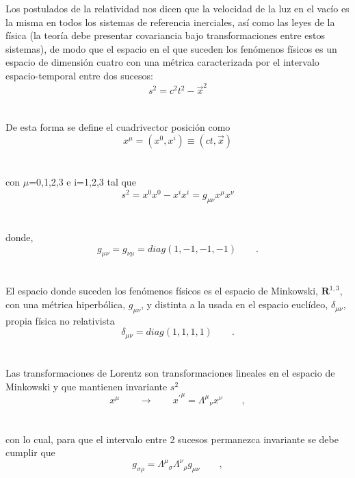 \documentclass[11pt,letterpaper]{article}     %
\begin{document}
Los postulados de la relatividad nos dicen que la velocidad de la luz en el vacío es la misma en todos los sistemas de referencia inerciales, así como las leyes de la física (la teoría debe presentar covariancia bajo transformaciones entre estos sistemas), de modo que el espacio en el que suceden los fenómenos físicos es un espacio de dimensión cuatro con una métrica caracterizada por el intervalo espacio-temporal entre dos sucesos:
\begin{equation} \label{eq:3}
s^2=c^2t^2-\vec{x}^{ 2}
\end{equation} \\ \\
De esta forma se define el cuadrivector posición como
\begin{equation}\label{eq:4}
x^\mu=(x^0,x^i) \equiv (ct,\vec{x})
\end{equation} \\ \\
con $\mu$=0,1,2,3 e i=1,2,3 tal que
\begin{equation} \label{eq:5}
s^2=x^0x^0 - x^i x^i = g_{\mu \nu} x^\mu x^\nu
\end{equation} \\ \\
donde,
\begin{equation} \label{eq:6}
g_{\mu \nu} = g_{\nu \mu} = diag(1,-1,-1,-1) \qquad .
\end{equation} \\ \\
El espacio donde suceden los fenómenos físicos es el espacio de Minkowski, $\mathbf{R}^{1,3}$, con una métrica hiperbólica, $g_{\mu \nu}$, y distinta a la usada en el espacio euclídeo, $\delta_{\mu \nu}$, propia física no relativista
\begin{equation} \label{eq:7}
\delta_{\mu \nu} = diag(1,1,1,1) \qquad .
\end{equation} \\ \\
 Las transformaciones de Lorentz son transformaciones lineales en el espacio de Minkowski y que mantienen invariante $s^2$
\begin{equation} \label{eq:8}
x^{\mu} \qquad \rightarrow \qquad {x^{'}}^{\mu}={\Lambda^\mu}_\nu x^\nu \qquad,
\end{equation} \\ \\
con lo cual, para que el intervalo entre 2 sucesos permanezca invariante se debe cumplir que
\begin{equation}  \label{eq:9}
g_{\sigma \rho}={\Lambda^\mu}_\sigma {\Lambda^\nu}_\rho g_{\mu \nu} \qquad ,
\end{equation} \\ \\
\end{document}
